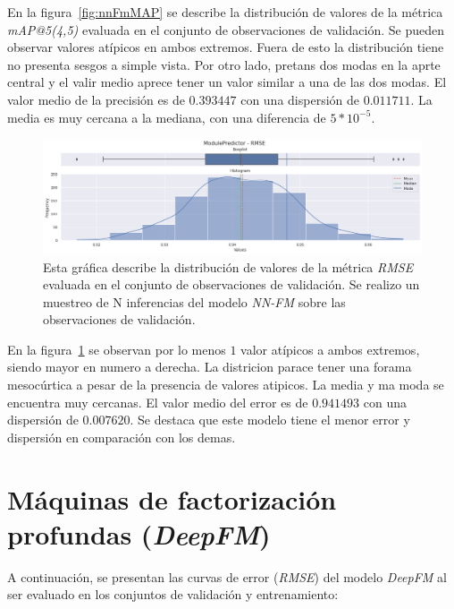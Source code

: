 \documentclass[11pt,a4paper,twoside]{thesis}
\begin{document}
En la figura~\ref{fig:nnFmMAP} se describe la distribución de valores de la
métrica \textit{mAP@5(4,5)} evaluada en el conjunto de observaciones de
validación. Se pueden observar valores atípicos en ambos extremos. Fuera de
esto la distribución tiene no presenta sesgos a simple vista. Por otro lado,
pretans dos modas en la aprte central y el valir medio aprece tener un valor
similar a una de las dos modas. El valor medio de la precisión es de $0.393447$
con una dispersión de $0.011711$. La media es muy cercana a la mediana, con una
diferencia de $5*10^{-5}$.

\begin{figure}[h!]
	\centering
	\includegraphics[width=15cm]{./images/metrics-NN-FM-RMSE.png}
	\caption{
		Esta gráfica describe la distribución de valores de la métrica
		\textit{RMSE} evaluada en el conjunto de observaciones de
		validación. Se realizo un muestreo de N inferencias del modelo
		\textit{NN-FM} sobre las observaciones
		de validación.
	}
	\label{fig:nnFmRMSE}
\end{figure}

En la figura~\ref{fig:nnFmRMSE} se observan por lo menos $1$ valor atípicos a
ambos extremos, siendo mayor en numero a derecha. La districion parace tener
una forama mesocúrtica a pesar de la presencia de valores atipicos. La media y
ma moda se encuentra muy cercanas. El valor medio del error es de $0.941493$
con una dispersión de $0.007620$. Se destaca que este modelo tiene el menor
error y dispersión en comparación con los demas.

\clearpage

\section{Máquinas de factorización profundas (\textit{DeepFM})}

A continuación, se presentan las curvas de error (\textit{RMSE}) del modelo
\textit{DeepFM} al ser evaluado en los conjuntos de validación y entrenamiento:
\end{document}
